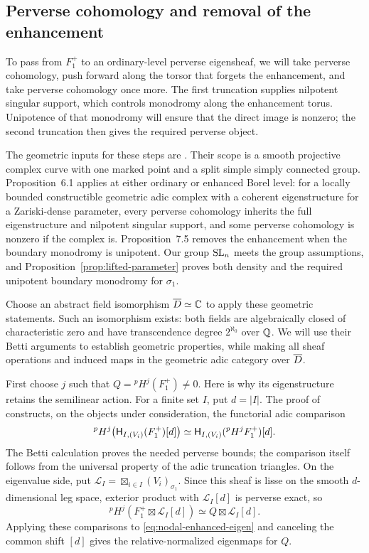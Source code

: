 \subsection{Perverse cohomology and removal of the enhancement}

To pass from $F_1^+$ to an ordinary-level perverse eigensheaf, we
will take perverse cohomology, push forward along the torsor that
forgets the enhancement, and take perverse cohomology once more.
The first truncation supplies nilpotent singular support, which
controls monodromy along the enhancement torus.  Unipotence of that
monodromy will ensure that the direct image is nonzero; the second
truncation then gives the required perverse object.

The geometric inputs for these steps are
\cite[Propositions~6.1 and 7.5]{CT}.  Their scope is a smooth
projective complex curve with one marked
point and a split simple simply connected group.  Proposition~6.1
applies at either ordinary or enhanced Borel level: for a locally
bounded constructible geometric adic complex with a coherent
eigenstructure for a Zariski-dense parameter, every perverse
cohomology inherits the full eigenstructure and nilpotent singular
support, and some perverse cohomology is nonzero if the complex is.
Proposition~7.5 removes the enhancement when the boundary monodromy
is unipotent.  Our group $\mathrm{SL}_n$ meets the group assumptions, and
Proposition~\ref{prop:lifted-parameter} proves both density and the
required unipotent boundary monodromy for $\sigma_1$.

Choose an abstract field isomorphism $\overline D\simeq\mathbb C$ to apply these
geometric statements.  Such an isomorphism exists: both fields
are algebraically closed of characteristic zero and have
transcendence degree $2^{\aleph_0}$ over $\mathbb Q$.  We will use their
Betti arguments to establish geometric properties, while making
all sheaf operations and induced maps in the geometric adic
category over $\overline D$.

First choose $j$ such that $Q={}^pH^j(F_1^+)\ne0$.
Here is why its eigenstructure retains the semilinear action.
For a finite set $I$, put $d=|I|$.  The proof of
\cite[Proposition~6.1, Section~6.3]{CT} constructs, on the objects
under consideration, the functorial adic comparison
\begin{equation}\label{eq:nodal-truncation}
 {}^pH^j\bigl(\mathsf H_{I,(V_i)}(F_1^+)[d]\bigr)
 \simeq \mathsf H_{I,(V_i)}({}^pH^jF_1^+)[d].
\end{equation}
The Betti calculation proves the needed perverse bounds; the
comparison itself follows from the universal property of the
adic truncation triangles.  On the eigenvalue side, put
$\mathcal L_I=\boxtimes_{i\in I}(V_i)_{\sigma_1}$.  Since this
sheaf is lisse on the smooth $d$-dimensional leg space, exterior
product with $\mathcal L_I[d]$ is perverse exact, so
\[
 {}^pH^j(F_1^+\boxtimes\mathcal L_I[d])
       \simeq Q\boxtimes\mathcal L_I[d].
\]
Applying these comparisons to \eqref{eq:nodal-enhanced-eigen}
and canceling the common shift $[d]$ gives the relative-normalized
eigenmaps for $Q$.

